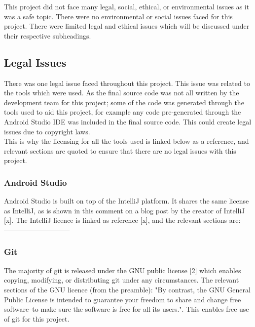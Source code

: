 \documentclass{article}
\begin{document}
This project did not face many legal, social, ethical, or environmental issues as it was a safe topic. There were no environmental or social issues faced for this project. There were limited legal and ethical issues which will be discussed under their respective subheadings. 

\subsection{Legal Issues}

There was one legal issue faced throughout this project. This issue was related to the tools which were used. As the final source code was not all written by the development team for this project; some of the code was generated through the tools used to aid this project, for example any code pre-generated through the Android Studio IDE was included in the final source code. This could create legal issues due to copyright laws. \\

This is why the licensing for all the tools used is linked below as a reference, and relevant sections are quoted to ensure that there are no legal issues with this project. \\

\subsubsection{Android Studio}

Android Studio is built on top of the IntelliJ platform. It shares the same license as IntelliJ, as is shown in this comment on a blog post by the creator of IntelliJ [x]. The IntelliJ licence is linked as reference [x], and the relevant sections are: -----------------------------\\


\subsubsection{Git}

The majority of git is released under the GNU public license [2] which enables copying, modifying, or distributing git under any circumstances. The relevant sections of the GNU licence (from the preamble): "By contrast, the GNU General Public License is intended to guarantee your freedom to share and change free software--to make sure the software is free for all its users.". This enables free use of git for this project. \\
\end{document}
